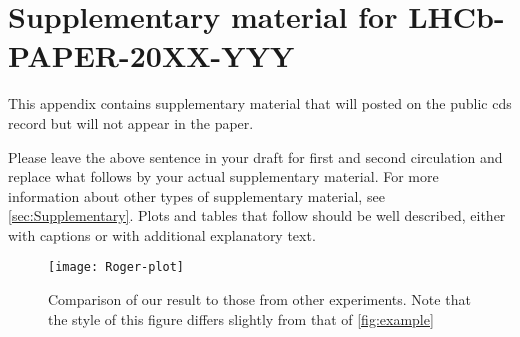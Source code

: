 \clearpage

\section{Supplementary material for LHCb-PAPER-20XX-YYY}
\label{sec:Supplementary-App}

This appendix contains supplementary material that will posted
on the public cds record but will not appear in the paper.

Please leave the above sentence in your draft for first and 
second circulation and replace what follows by your actual supplementary material.
For more information about other types of supplementary material, see \cref{sec:Supplementary}. Plots and tables that follow should be well described, either with captions or with additional explanatory text.


\begin{figure}[!htb]
  \begin{center}
    \texttt{[image: Roger-plot]}
    \vspace*{-1.0cm}
  \end{center}
  \caption{
    \small %
    Comparison of our result to those from other experiments.
    Note that the style of this figure differs slightly from that of \cref{fig:example}}
  \label{fig:roger}
\end{figure}

\clearpage
